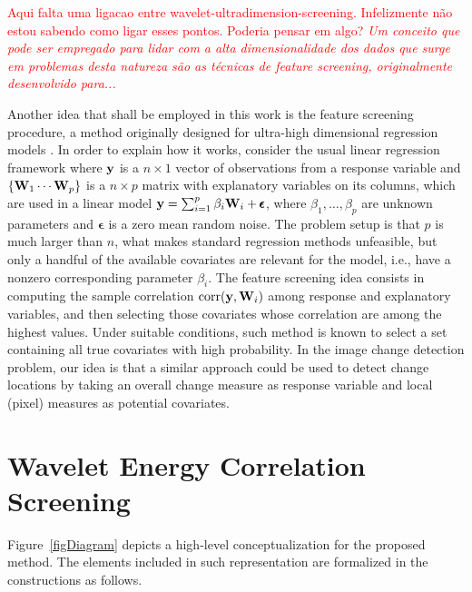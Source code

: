 \documentclass[journal]{IEEEtran}
\newcommand{\vepsilon}{\pmb{\epsilon}}
\newcommand{\vW}{{\textbf W}}
\newcommand{\vy}{{\textbf y}}
\begin{document}
\textcolor{red}{Aqui falta uma ligacao entre wavelet-ultradimension-screening. Infelizmente não estou sabendo como ligar esses pontos. Poderia pensar em algo?
\textit{Um conceito que pode ser empregado para lidar com a alta dimensionalidade dos dados que surge em problemas desta natureza são as técnicas de feature screening, originalmente desenvolvido para...}
}

Another idea that shall be employed in this work is the feature screening procedure, a method originally designed for ultra-high dimensional regression models \cite{fan2008sure}. In order to explain how it works, consider the usual linear regression framework where $\vy$ is a $n\times 1$ vector of observations from a response variable and $\{\vW_1 \cdots \vW_p\}$ is a $n\times p$ matrix with explanatory variables on its columns, which are used in a linear model $\vy = \sum_{i=1}^{p}\beta_i\vW_i + \vepsilon$, where $\beta_1,\ldots,\beta_p$ are unknown parameters and $\vepsilon$ is a zero mean random noise. The problem setup is that $p$ is much larger than $n$, what makes standard regression methods unfeasible, but only a handful of the available covariates are relevant for the model, i.e., have a nonzero corresponding parameter $\beta_i$. The feature screening idea consists in computing the sample correlation $\mathrm{corr}(\vy,\vW_i)$ among response and explanatory variables, and then selecting those covariates whose correlation are among the highest values. Under suitable conditions, such method is known to select a set containing all true covariates with high probability. In the image change detection problem, our idea is that a similar approach could be used to detect change locations by taking an overall change measure as response variable and local (pixel) measures as potential covariates.



\section{Wavelet Energy Correlation Screening}\label{section_method}


Figure~\ref{figDiagram} depicts a high-level conceptualization for the proposed method. The elements included in such representation are formalized in the constructions as follows.
\end{document}
